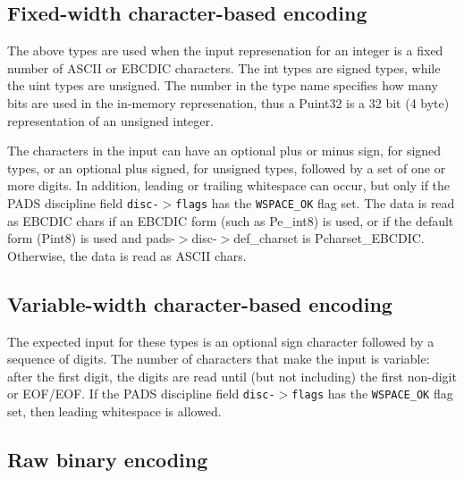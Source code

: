 \subsection{Fixed-width character-based encoding}

\aedBegin{}
\aedEnd{}

The above types are used when the input represenation for an integer
is a fixed number of ASCII or EBCDIC characters.  The int types are
signed types, while the uint types are unsigned.  The number in the
type name specifies how many bits are used in the in-memory
represenation, thus a Puint32 is a 32 bit (4 byte) representation of
an unsigned integer.

The characters in the input can have an optional plus or minus sign, for
signed types, or an optional plus signed, for unsigned types, followed
by a set of one or more digits.   In addition, leading or
trailing whitespace can occur, but only if the PADS discipline field
{\tt disc-$>$flags} has the {\tt WSPACE\_OK} flag set.
The data is read as EBCDIC chars if an EBCDIC
form (such as Pe\_int8) is used, or if the default form (Pint8) is used and
pads-$>$disc-$>$def\_charset is Pcharset\_EBCDIC.  Otherwise, the data is
read as ASCII chars.

\subsection{Variable-width character-based encoding}

\aedBegin{}
\aedEnd{}

The expected input for these types is an optional sign character
followed by a sequence of digits.  The number of characters that make
the input is variable: after the first digit, the digits are read
until (but not including) the first non-digit or EOF/EOF.
If the PADS discipline field
{\tt disc-$>$flags} has the {\tt WSPACE\_OK} flag set, then
leading whitespace is allowed.

\subsection{Raw binary encoding}

\bBegin{}
\bEnd{}


